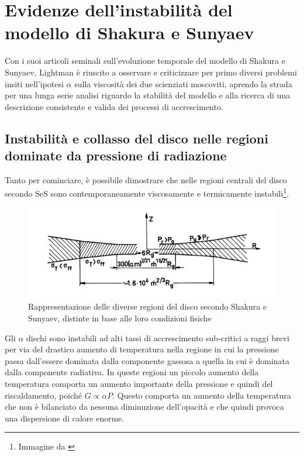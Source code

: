 \documentclass[a4paperbi]{article}
\begin{document}
\newpage
\section{Evidenze dell'instabilità del modello di Shakura e Sunyaev}
	Con i suoi articoli seminali sull'evoluzione temporale del modello di Shakura e Sunyaev, Lightman è riuscito a osservare e criticizzare per primo diversi problemi insiti nell'ipotesi $\alpha$ sulla viscosità dei due scienziati moscoviti, aprendo la strada per una lunga serie analisi riguardo la stabilità del modello e alla ricerca di una descrizione consistente e valida dei processi di accrescimento.
	
	\subsection{Instabilità e collasso del disco nelle regioni dominate da pressione di radiazione}
	Tanto per cominciare, è possibile dimostrare che nelle regioni centrali del disco secondo SeS sono contemporaneamente viscosamente e termicamente instabili\footnote{Immagine da \cite{ShakuraSunyaev1973}}.
	
	\begin{figure}[H]
		\centering
		\includegraphics[width=0.9\linewidth]{RegioniDisco}
		\caption{Rappresentazione delle diverse regioni del disco secondo Shakura e Sunyaev, distinte in base alle loro condizioni fisiche}
		\label{fig:RegioniDisco}
	\end{figure}
	
	Gli $\alpha$ dischi sono instabili ad alti tassi di accrescimento sub-critici a raggi brevi per via del drastico aumento di temperatura nella regione in cui la pressione passa dall'essere dominata dalla componente gassosa a quella in cui è dominata dalla componente radiativa. In queste regioni un piccolo aumento della temperatura comporta un aumento importante della pressione e quindi del riscaldamento, poiché $G\propto\alpha P$. Questo comporta un aumento della temperatura che non è bilanciato da nessuna diminuzione dell'opacità e che quindi provoca una dispersione di calore enorme.
	 
\end{document}
